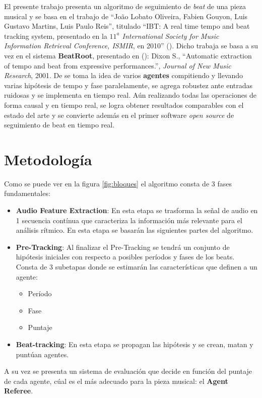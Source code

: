 \documentclass[12pt,a4paper,titlepage]{report}
\begin{document}
El presente trabajo presenta un algoritmo de seguimiento de \emph{beat} de una pieza musical y se basa en el trabajo de ``Jo\~ao Lobato Oliveira, Fabien Gouyon, Luis Gustavo Martins, Luis Paulo Reis'', titulado ``IBT: A real time tempo and beat tracking system, presentado en la \emph{$11^a$ International Society for Music Information Retrieval Conference, ISMIR}, en 2010'' (\cite{bib:el_posta}). Dicho trabaja se basa a su vez en el sistema \textbf{BeatRoot}, presentado en (\cite{bib:dixon}): Dixon S., ``Automatic extraction of tempo and beat from expressive performances.'', \emph{Journal of New Music Research}, 2001. De \cite{bib:dixon} se toma la idea de varios \textbf{agentes} compitiendo y llevando varias hipótesis de tempo y fase paralelamente, se agrega robustez ante entradas ruidosas y se implementa en tiempo real. Aún realizando todas las operaciones de forma causal y en tiempo real, se logra obtener resultados comparables con el estado del arte y se convierte además en el primer software \emph{open source} de seguimiento de beat en tiempo real.


\chapter{Metodología}
\label{sec:metodologia}

Como se puede ver en la figura \ref{fig:bloques} el algoritmo consta de 3 fases fundamentales:
\begin{itemize}
\item \textbf{Audio Feature Extraction}: En esta etapa se trasforma la señal de audio en 1 secuencia contínua que caracteriza la información más relevante para el análisis rítmico. En esta etapa se basarán las siguientes partes del algoritmo.
\item \textbf{Pre-Tracking}: Al finalizar el Pre-Tracking se tendrá un conjunto de hipótesis iniciales con respecto a posibles períodos y fases de los beats. Consta de 3 subetapas donde se estimarán las características que definen a un agente:
\begin{itemize}
\item Período
\item Fase
\item Puntaje
\end{itemize}
\item \textbf{Beat-tracking}: En esta etapa se propagan las hipótesis y se crean, matan y puntúan agentes.
\end{itemize}

A su vez se presenta un sistema de evaluación que decide en función del puntaje de cada agente, cúal es el más adecuado para la pieza musical: el \textbf{Agent Referee}.
\end{document}
